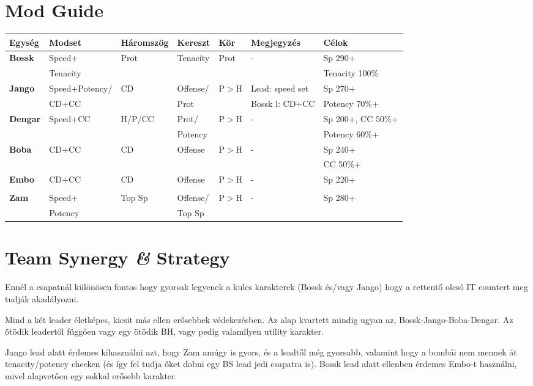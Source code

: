 \documentclass[11pt]{report}
\begin{document}
\section{Mod Guide}
    \begin{center}
    \begin{tabular}{|l | l | l | l | l | l | l |}
        \hline
        Egység & Modset & Háromszög & Kereszt & Kör & Megjegyzés & Célok\\ \hline
        \textbf{Bossk} & Speed+ & Prot & Tenacity & Prot & - & Sp 290+\\
        & Tenacity &  &  &  &  & Tenacity 100\%\\ \hline
        \textbf{Jango} & Speed+Potency/ & CD & Offense/ & P$>$H & Lead: speed set & Sp   270+\\
        & CD+CC &  & Prot &  & Bossk l: CD+CC & Potency 70\%+\\ \hline
        \textbf{Dengar} & Speed+CC & H/P/CC & Prot/ & P$>$H & - & Sp 200+, CC 50\%+\\
        &  &  & Potency &  &  & Potency 60\%+\\ \hline
        \textbf{Boba} & CD+CC & CD & Offense & P$>$H & -  & Sp 240+\\
        &  &  &  &  &  & CC 50\%+\\ \hline
        \textbf{Embo} & CD+CC & CD & Offense & P$>$H & - & Sp 220+\\
        &  &  &  &  &  & \\ \hline
        \textbf{Zam} & Speed+ & Top Sp & Offense/ & P$>$H & - & Sp 280+\\
        & Potency &  & Top Sp &  &  & \\ \hline
        
    \end{tabular}
\end{center}
\section{Team Synergy \textit{\&} Strategy}
Ennél a csapatnál különösen fontos hogy gyorsak legyenek a kulcs karakterek (Bossk és/vagy Jango) hogy a rettentő olcsó IT countert meg tudják akadályozni.\par
Mind a két leader életképes, kicsit más ellen erősebbek védekezésben. Az alap kvartett mindig ugyan az, Bossk-Jango-Boba-Dengar. Az ötödik leadertől függően vagy egy ötödik BH, vagy pedig valamilyen utility karakter.\par
Jango lead alatt érdemes kihasználni azt, hogy Zam amúgy is gyors, és a leadtől még gyorsabb, valamint hogy a bombái nem mennek át tenacity/potency checken (és így fel tudja őket dobni egy BS lead jedi csapatra is). Bossk lead alatt ellenben érdemes Embo-t használni, mivel alapvetően egy sokkal erősebb karakter.
\end{document}
